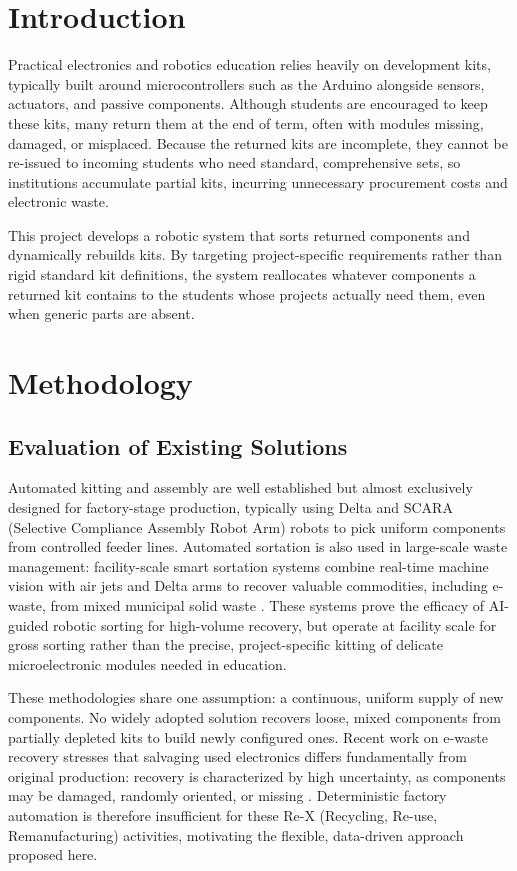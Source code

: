 \documentclass[11pt,conference]{IEEEtran}
\begin{document}
\section{Introduction}
Practical electronics and robotics education relies heavily on development kits, typically built around microcontrollers such as the Arduino alongside sensors, actuators, and passive components. Although students are encouraged to keep these kits, many return them at the end of term, often with modules missing, damaged, or misplaced. Because the returned kits are incomplete, they cannot be re-issued to incoming students who need standard, comprehensive sets, so institutions accumulate partial kits, incurring unnecessary procurement costs and electronic waste.

This project develops a robotic system that sorts returned components and dynamically rebuilds kits. By targeting project-specific requirements rather than rigid standard kit definitions, the system reallocates whatever components a returned kit contains to the students whose projects actually need them, even when generic parts are absent.

\section{Methodology}
\subsection{Evaluation of Existing Solutions}
Automated kitting and assembly are well established but almost exclusively designed for factory-stage production, typically using Delta and SCARA (Selective Compliance Assembly Robot Arm) robots to pick uniform components from controlled feeder lines. Automated sortation is also used in large-scale waste management: facility-scale smart sortation systems combine real-time machine vision with air jets and Delta arms to recover valuable commodities, including e-waste, from mixed municipal solid waste \cite{amp}. These systems prove the efficacy of AI-guided robotic sorting for high-volume recovery, but operate at facility scale for gross sorting rather than the precise, project-specific kitting of delicate microelectronic modules needed in education.

These methodologies share one assumption: a continuous, uniform supply of new components. No widely adopted solution recovers loose, mixed components from partially depleted kits to build newly configured ones. Recent work on e-waste recovery stresses that salvaging used electronics differs fundamentally from original production: recovery is characterized by high uncertainty, as components may be damaged, randomly oriented, or missing \cite{saenz}. Deterministic factory automation is therefore insufficient for these Re-X (Recycling, Re-use, Remanufacturing) activities, motivating the flexible, data-driven approach proposed here.
\end{document}
